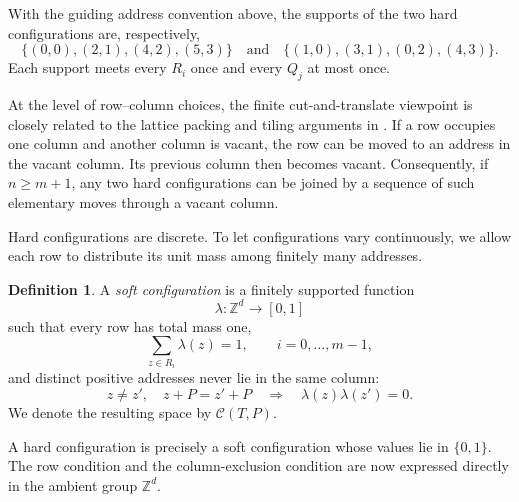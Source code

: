 \documentclass[11pt,reqno]{amsart}
\numberwithin{equation}{section}
\theoremstyle{definition}
\newtheorem{definition}[theorem]{Definition}
\theoremstyle{remark}
\newcommand{\Z}{\mathbb Z}
\begin{document}
With the guiding address convention above, the supports
of the two hard configurations are, respectively,
\begin{equation}\label{eq:hard-picture-supports}
 \{(0,0),(2,1),(4,2),(5,3)\}
 \quad\text{and}\quad
 \{(1,0),(3,1),(0,2),(4,3)\}.
\end{equation}
Each support meets every $R_i$ once and every $Q_j$ at most once.

At the level of row--column choices, the finite cut-and-translate viewpoint
is closely related to the lattice packing and tiling arguments in
\cite{Kolountzakis1998Cubes,Kolountzakis2000Packing}.  If a row occupies one
column and another column is vacant, the row can be moved to an address in
the vacant column.  Its previous column then becomes vacant.  Consequently,
if $n\ge m+1$, any two hard configurations can be joined by a sequence of
such elementary moves through a vacant column.

Hard configurations are discrete.  To let configurations vary continuously,
we allow each row to distribute its unit mass among finitely many addresses.

\begin{definition}\label{def:soft-config}
A \emph{soft configuration} is a finitely supported function
\[
 \lambda:\Z^d\longrightarrow[0,1]
\]
such that every row has total mass one,
\begin{equation}\label{eq:soft-row}
 \sum_{z\in R_i}\lambda(z)=1,
 \qquad i=0,\ldots,m-1,
\end{equation}
and distinct positive addresses never lie in the same column:
\begin{equation}\label{eq:soft-column}
 z\ne z',\quad z+P=z'+P
 \quad\Longrightarrow\quad
 \lambda(z)\lambda(z')=0.
\end{equation}
We denote the resulting space by $\mathcal C(T,P)$.
\end{definition}

A hard configuration is precisely a soft configuration whose values lie in
$\{0,1\}$.  The row condition and the column-exclusion condition are now
expressed directly in the ambient group $\Z^d$.
\end{document}
